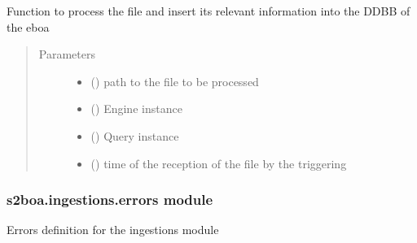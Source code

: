 \begin{fulllineitems}
\label{\detokenize{s2boa.ingestions:s2boa.ingestions.ingestion_station_schedule.ingestion_station_schedule.process_file}}
Function to process the file and insert its relevant information
into the DDBB of the eboa
\begin{quote}\begin{description}
\item[{Parameters}] \leavevmode\begin{itemize}
\item {} 
 () \textendash{} path to the file to be processed

\item {} 
 () \textendash{} Engine instance

\item {} 
 () \textendash{} Query instance

\item {} 
 () \textendash{} time of the reception of the file by the triggering

\end{itemize}

\end{description}\end{quote}

\end{fulllineitems}



\subsubsection{s2boa.ingestions.errors module}
\label{\detokenize{s2boa.ingestions:module-s2boa.ingestions.errors}}\label{\detokenize{s2boa.ingestions:s2boa-ingestions-errors-module}}
Errors definition for the ingestions module

